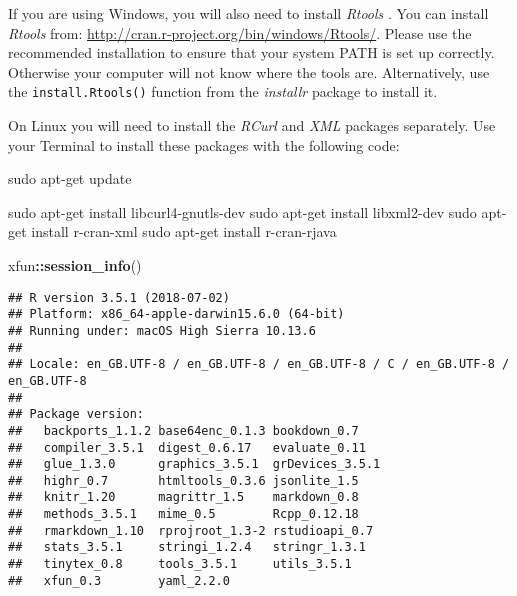 \documentclass[]{krantz}
\makeatletter
\newenvironment{Shaded}{\begin{snugshade}}{\end{snugshade}}
\newcommand{\FunctionTok}[1]{\textcolor[rgb]{0,0,0}{#1}}
\newcommand{\KeywordTok}[1]{\textcolor[rgb]{0.27,0.27,0.27}{\textbf{#1}}}
\newcommand{\NormalTok}[1]{#1}
\newcommand{\OperatorTok}[1]{\textcolor[rgb]{0.43,0.43,0.43}{\textbf{#1}}}
\newenvironment{kframe}{%
\medskip{}
\setlength{\fboxsep}{.8em}
 \def\at@end@of@kframe{}%
 \ifinner\ifhmode%
  \def\at@end@of@kframe{\end{minipage}}%
  \begin{minipage}{\columnwidth}%
 \fi\fi%
 \def\FrameCommand##1{\hskip\@totalleftmargin \hskip-\fboxsep
 \colorbox{shadecolor}{##1}\hskip-\fboxsep
     \hskip-\linewidth \hskip-\@totalleftmargin \hskip\columnwidth}%
 \MakeFramed {\advance\hsize-\width
   \@totalleftmargin\z@ \linewidth\hsize
   \@setminipage}}%
 {\par\unskip\endMakeFramed%
 \at@end@of@kframe}
\renewenvironment{Shaded}{\begin{kframe}}{\end{kframe}}
\theoremstyle{definition}
\theoremstyle{definition}
\theoremstyle{definition}
\theoremstyle{remark}
\makeatother
\begin{document}

If you are using Windows, you will also need to install \emph{Rtools}
\cite[]{Rtools}. You can install \emph{Rtools} from:
\url{http://cran.r-project.org/bin/windows/Rtools/}.\label{RtoolsDownload}
Please use the recommended installation to ensure that your system
PATH is set up correctly. Otherwise your computer will not
know where the tools are. Alternatively, use the
\texttt{install.Rtools()} function from the \emph{installr}
\citep{galili2018} package to install it.



On Linux you will need to install the \emph{RCurl}
\citep{R-RCurl} and \emph{XML} \citep{R-XML}
packages separately. Use your Terminal to install these
packages with the following code:

\begin{Shaded}
\begin{Highlighting}[]
\FunctionTok{sudo}\NormalTok{ apt-get update}

\FunctionTok{sudo}\NormalTok{ apt-get install libcurl4-gnutls-dev}
\FunctionTok{sudo}\NormalTok{ apt-get install libxml2-dev}
\FunctionTok{sudo}\NormalTok{ apt-get install r-cran-xml}
\FunctionTok{sudo}\NormalTok{ apt-get install r-cran-rjava}
\end{Highlighting}
\end{Shaded}


\begin{Shaded}
\begin{Highlighting}[]
\NormalTok{xfun}\OperatorTok{::}\KeywordTok{session_info}\NormalTok{()}
\end{Highlighting}
\end{Shaded}

\begin{verbatim}
## R version 3.5.1 (2018-07-02)
## Platform: x86_64-apple-darwin15.6.0 (64-bit)
## Running under: macOS High Sierra 10.13.6
## 
## Locale: en_GB.UTF-8 / en_GB.UTF-8 / en_GB.UTF-8 / C / en_GB.UTF-8 / en_GB.UTF-8
## 
## Package version:
##   backports_1.1.2 base64enc_0.1.3 bookdown_0.7   
##   compiler_3.5.1  digest_0.6.17   evaluate_0.11  
##   glue_1.3.0      graphics_3.5.1  grDevices_3.5.1
##   highr_0.7       htmltools_0.3.6 jsonlite_1.5   
##   knitr_1.20      magrittr_1.5    markdown_0.8   
##   methods_3.5.1   mime_0.5        Rcpp_0.12.18   
##   rmarkdown_1.10  rprojroot_1.3-2 rstudioapi_0.7 
##   stats_3.5.1     stringi_1.2.4   stringr_1.3.1  
##   tinytex_0.8     tools_3.5.1     utils_3.5.1    
##   xfun_0.3        yaml_2.2.0
\end{verbatim}
\end{document}
